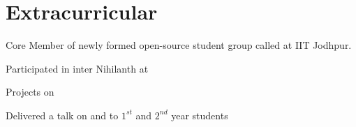 \documentclass[]{deedy-resume-openfont}
\begin{document}
\begin{minipage}[t]{0.67\textwidth}

\section{Extracurricular} 
\begin{bulletedlist}
\item Core Member of newly formed open-source student group called  at IIT Jodhpur.
\item Participated in inter  Nihilanth at 
\item {} Projects on 
\item Delivered a talk on  and  to $1^{st}$  and $2^{nd}$ year students

\end{bulletedlist}
\end{minipage} 
\end{document}
